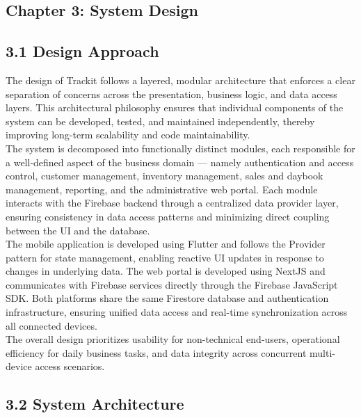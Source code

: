 \documentclass[12pt, oneside]{article}
\begin{document}
\clearpage
\begin{center}
    \section*{Chapter 3: System Design}
\end{center}

\subsection*{3.1 Design Approach}

The design of Trackit follows a layered, modular architecture that enforces a clear separation of concerns across the presentation, business logic, and data access layers. This architectural philosophy ensures that individual components of the system can be developed, tested, and maintained independently, thereby improving long-term scalability and code maintainability.\\[0.25cm]
The system is decomposed into functionally distinct modules, each responsible for a well-defined aspect of the business domain — namely authentication and access control, customer management, inventory management, sales and daybook management, reporting, and the administrative web portal. Each module interacts with the Firebase backend through a centralized data provider layer, ensuring consistency in data access patterns and minimizing direct coupling between the UI and the database.\\[0.25cm]
The mobile application is developed using Flutter and follows the Provider pattern for state management, enabling reactive UI updates in response to changes in underlying data. The web portal is developed using NextJS and communicates with Firebase services directly through the Firebase JavaScript SDK. Both platforms share the same Firestore database and authentication infrastructure, ensuring unified data access and real-time synchronization across all connected devices.\\[0.25cm]
The overall design prioritizes usability for non-technical end-users, operational efficiency for daily business tasks, and data integrity across concurrent multi-device access scenarios.

\subsection*{3.2 System Architecture}
\end{document}
